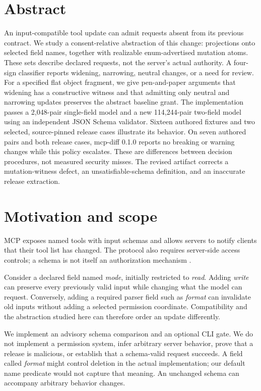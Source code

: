 \section*{Abstract}\label{abstract}

An input-compatible tool update can admit requests absent from its previous contract. We study a consent-relative abstraction of this change: projections onto selected field names, together with realizable enum-advertised mutation atoms. These sets describe declared requests, not the server's actual authority. A four-sign classifier reports widening, narrowing, neutral changes, or a need for review. For a specified flat object fragment, we give pen-and-paper arguments that widening has a constructive witness and that admitting only neutral and narrowing updates preserves the abstract baseline grant. The implementation passes a 2,048-pair single-field model and a new 114,244-pair two-field model using an independent JSON Schema validator. Sixteen authored fixtures and two selected, source-pinned release cases illustrate its behavior. On seven authored pairs and both release cases, mcp-diff 0.1.0 reports no breaking or warning changes while this policy escalates. These are differences between decision procedures, not measured security misses. The revised artifact corrects a mutation-witness defect, an unsatisfiable-schema definition, and an inaccurate release extraction.

\section{Motivation and scope}\label{motivation-and-scope}

MCP exposes named tools with input schemas and allows servers to notify clients that their tool list has changed. The protocol also requires server-side access controls; a schema is not itself an authorization mechanism \citep{mcp-tools}.

Consider a declared field named \emph{mode}, initially restricted to \emph{read}. Adding \emph{write} can preserve every previously valid input while changing what the model can request. Conversely, adding a required parser field such as \emph{format} can invalidate old inputs without adding a selected permission coordinate. Compatibility and the abstraction studied here can therefore order an update differently.

We implement an advisory schema comparison and an optional CLI gate. We do not implement a permission system, infer arbitrary server behavior, prove that a release is malicious, or establish that a schema-valid request succeeds. A field called \emph{format} might control deletion in the actual implementation; our default name predicate would not capture that meaning. An unchanged schema can accompany arbitrary behavior changes.

